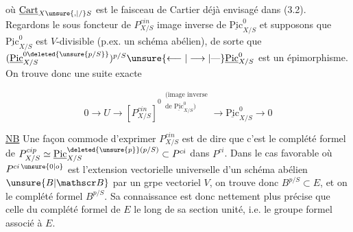 
où $\underline{\mathrm{Cart}}_{X\unsure{,|/}S}$ est le faisceau de Cartier déjà envisagé dans (3.2). Regardons le sous foncteur de  $P^{cin}_{X/S}$ image inverse de $\underline{\mathrm{Pic}}^0_{X/S}$ et supposons que $\underline{\mathrm{Pic}}^0_{X/S}$ est $V$-divisible (p.ex. un schéma abélien), de sorte que $(\underline{\mathrm{Pic}}^{0\deleted{\unsure{p/S}}}_{X/S})^{p/S}\unsure{\longleftarrow|\longrightarrow|\text{—}}\underline{\mathrm{Pic}}^0_{X/S}$ est un épimorphisme. On trouve donc une suite exacte

\[
0\longrightarrow U\longrightarrow [P^{cin}_{X/S}]^{0\ \substack{\text{(image inverse}\\\text{de }\underline{\mathrm{Pic}}^0_{X/S})}}\longrightarrow\underline{\mathrm{Pic}}^0_{X/S}\longrightarrow0\tag*{(4.6)}
\]

\uline{NB} Une façon commode d'exprimer $P^{cin}_{X/S}$ est de dire que c'est le complété formel de $P^{cip}_{X/S}\simeq\underline{\mathrm{Pic}}_{X/S}^{\deleted{\unsure{p}}(p/S)}\subset P^{ci}$ dans $P^{ci}$. Dans le cas favorable où $P^{ci\,\unsure{0|o}}$ est l'extension vectorielle universelle  d'un schéma abélien $\unsure{B|\mathscr B}$ par un grpe vectoriel $V$, on trouve   donc $B^{p/S}\subset E$, et on   le complété formel   $B^{p/S}$. Sa connaissance est donc nettement plus précise que celle du complété formel  de $E$ le long de sa section unité, i.e. le groupe formel associé à $E$.

